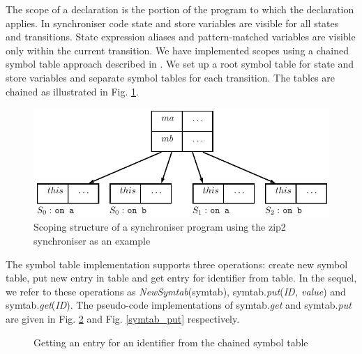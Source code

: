 The scope of a declaration is the portion of the program to which the declaration applies. In synchroniser code state and store variables are visible for all states and transitions. State expression aliases and pattern-matched variables are visible only within the current transition. We have implemented scopes using a chained symbol table approach described in \cite{dragonbook}. We set up a root symbol table for state and store variables and separate symbol tables for each transition. The tables are chained as illustrated in Fig. \ref{fig:symtab_chain}.

  \begin{figure}[h!]
  \centering
  \includegraphics[scale=0.8]{figs/chapter_02_symtab_chain.pdf}
  \caption{Scoping structure of a synchroniser program using the zip2 synchroniser as an example}
  \label{fig:symtab_chain}
  \end{figure}

The symbol table implementation supports three operations: create new symbol table, put new entry in table and get entry for identifier from table. In the sequel, we refer to these operations as \emph{NewSymtab}(symtab), symtab.\emph{put}(\emph{ID, value}) and symtab.\emph{get}(\emph{ID}). The pseudo-code implementations of symtab.\emph{get} and symtab.\emph{put} are given in Fig. \ref{symtab_get} and Fig. \ref{symtab_put} respectively.

\begin{figure}%
\noindent{}
\caption{Getting an entry for an identifier from the chained symbol table\label{symtab_get}}
\end{figure}


